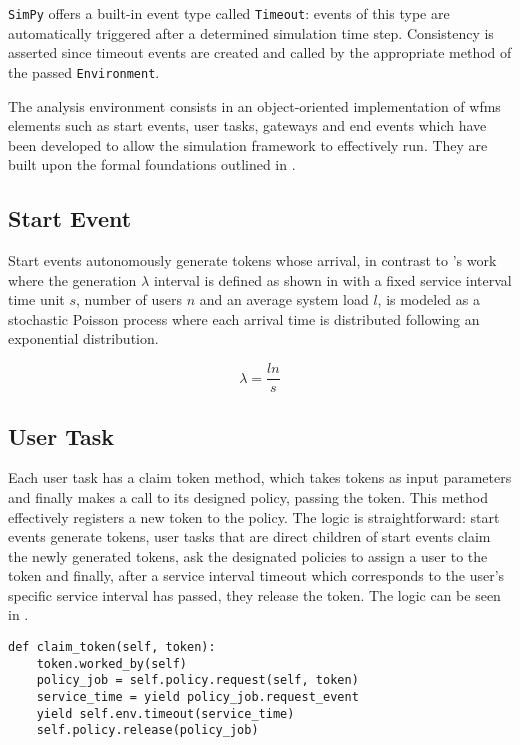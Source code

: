\texttt{SimPy} offers a built-in event type called \texttt{Timeout}: events of this type are automatically triggered after a determined simulation time step. Consistency is asserted since timeout events are created and called by the appropriate method of the passed \texttt{Environment}.

The analysis environment consists in an object-oriented implementation of \gls{wfms} elements such as start events, user tasks, gateways and end events which have been developed to allow the simulation framework to effectively run. They are built upon the formal foundations outlined in .

\subsection{Start Event}
\label{subsec:start_event}

Start events autonomously generate tokens whose arrival, in contrast to \citet{Zeng2005}'s work where the generation $\lambda$ interval is defined as shown in  with a fixed service interval time unit $s$, number of users $n$ and an average system load $l$, is modeled as a stochastic Poisson process where each arrival time is distributed following an exponential distribution. 

\begin{equation}
\label{eq:generation_interval}
	\lambda = \frac{l n}{s}
\end{equation}

\subsection{User Task}
\label{subsec:user_task}

Each user task has a claim token method, which takes tokens as input parameters and finally makes a call to its designed policy, passing the token. This method effectively registers a new token to the policy. The logic is straightforward: start events generate tokens, user tasks that are direct children of start events claim the newly generated tokens, ask the designated policies to assign a user to the token and finally, after a service interval timeout which corresponds to the user's specific service interval has passed, they release the token. The logic can be seen in .

\begin{lstlisting}[caption={User task claim method where a call to the corresponding policy request method is made. The policy performs role resolution effectively mapping a token to a user and returns the user's service time which is then yielded as a timeout in the discrete event simulation environment. When this time has elapsed, the policy releases the user.},label=lst:user_task,style=CustomPython]
def claim_token(self, token):
    token.worked_by(self)
    policy_job = self.policy.request(self, token)
    service_time = yield policy_job.request_event
    yield self.env.timeout(service_time)
    self.policy.release(policy_job)
\end{lstlisting}

